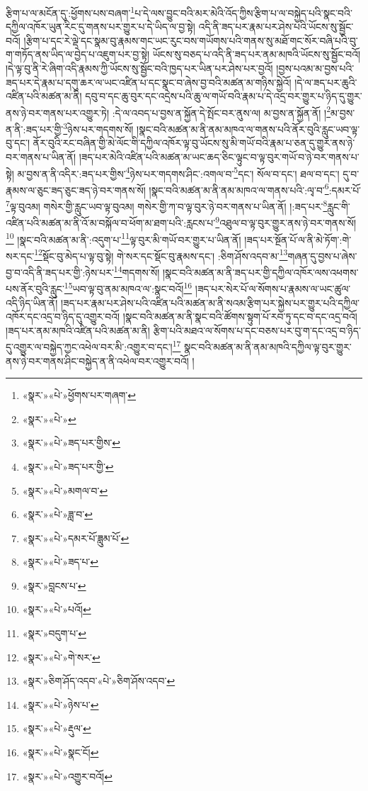 རྩིག་པ་ལ་མངོན་དུ་:ཕྱོགས་པས་བཞག་\footnote{«སྣར་»«པེ་»ཕྱོགས་པར་གཞག་}པ་དེ་ལས་བྱུང་བའི་མར་མེའི་འོད་ཀྱིས་རྩིག་པ་ལ་བསྐྱེད་པའི་སྣང་བའི་དཀྱིལ་འཁོར་ཡུན་རིང་དུ་གནས་པར་གྱུར་པ་དེ་ཡིད་ལ་བྱ་སྟེ། འདི་ནི་ཟད་པར་རྣམ་པར་ཤེས་པའི་ཡོངས་སུ་སྦྱོང་བའོ། །རྩིག་པ་དང་རེ་ལྡེ་དང་སྣམ་བུ་རྣམས་གང་ཡང་རུང་བས་གཡོགས་པའི་གནས་སུ་མཐོ་གང་སོར་བཞི་པའི་བུ་ག་གཏོད་ནས་ཡིད་ལ་བྱེད་པ་འཇུག་པར་བྱ་སྟེ། ཡོངས་སུ་བཅད་པ་འདི་ནི་ཟད་པར་ནམ་མཁའི་ཡོངས་སུ་སྦྱོང་བའོ། །དེ་ལྟ་བུ་ནི་རེ་ཞིག་འདི་རྣམས་ཀྱི་ཡོངས་སུ་སྦྱོང་བའི་ཁྱད་པར་ཡིན་པར་ཤེས་པར་བྱའོ། །བྱས་པའམ་མ་བྱས་པའི་ཟད་པར་དེ་རྣམ་པ་དགུ་ཆར་ལ་ཡང་འཛིན་པ་དང་སྣང་བ་ཞེས་བྱ་བའི་མཚན་མ་གཉིས་སྐྱེའོ། །དེ་ལ་ཟད་པར་ཆུའི་འཛིན་པའི་མཚན་མ་ནི། དབུ་བ་དང་ཆུ་བུར་དང་འདྲེས་པའི་ཆུ་ལ་གཡོ་བའི་རྣམ་པ་དེ་འདྲ་བར་གྱུར་པ་ཉིད་དུ་གྱུར་ནས་ཉེ་བར་གནས་པར་འགྱུར་ཏེ། :དེ་ལ་འབད་པ་བྱས་ན་སྐྱོན་དེ་སྤོང་བར་ནུས་ལ། མ་བྱས་ན་སྐྱོན་ནོ། །\footnote{«སྣར་»«པེ་»}མ་བྱས་ན་ནི་:ཟད་པར་གྱི་\footnote{«སྣར་»«པེ་»ཟད་པར་གྱིས་}ཉེས་པར་གདགས་སོ། །སྣང་བའི་མཚན་མ་ནི་ནམ་མཁའ་ལ་གནས་པའི་ནོར་བུའི་རླུང་ཡབ་ལྟ་བུ་དང་། ནོར་བུའི་རང་བཞིན་གྱི་མེ་ལོང་གི་དཀྱིལ་འཁོར་ལྟ་བུ་ཡོངས་སུ་མི་གཡོ་བའི་རྣམ་པ་ཅན་དུ་གྱུར་ནས་ཉེ་བར་གནས་པ་ཡིན་ནོ། །ཟད་པར་མེའི་འཛིན་པའི་མཚན་མ་ཡང་ཆད་ཅིང་ལྟུང་བ་ལྟ་བུར་གཡོ་བ་ཉེ་བར་གནས་པ་སྟེ། མ་བྱས་ན་ནི་འདིར་:ཟད་པར་གྱིས་\footnote{«སྣར་»«པེ་»ཟད་པར་གྱི་}ཉེས་པར་གདགས་ཤིང་:འགལ་བ་\footnote{«སྣར་»«པེ་»མགལ་བ་}དང་། སོལ་བ་དང་། ཐལ་བ་དང་། དུ་བ་རྣམས་ལ་ཅུང་ཟད་ཅུང་ཟད་ཉེ་བར་གནས་སོ། །སྣང་བའི་མཚན་མ་ནི་ནམ་མཁའ་ལ་གནས་པའི་:ལྭ་བ་\footnote{«སྣར་»«པེ་»ཟླ་བ་}:དམར་པོ་\footnote{«སྣར་»«པེ་»དམར་པོ་ཟླུམ་པོ་}ལྟ་བུའམ། གསེར་གྱི་རླུང་ཡབ་ལྟ་བུའམ། གསེར་གྱི་ཀ་བ་ལྟ་བུར་ཉེ་བར་གནས་པ་ཡིན་ནོ། །:ཟད་པར་\footnote{«སྣར་»«པེ་»ཟད་པ་}རླུང་གི་འཛིན་པའི་མཚན་མ་ནི་འོ་མ་བསྐོལ་བ་ཕོག་མ་ཐག་པའི་:རླངས་པ་\footnote{«སྣར་»བླངས་པ་}འཐུལ་བ་ལྟ་བུར་གྱུར་ནས་ཉེ་བར་གནས་སོ།\footnote{«སྣར་»«པེ་»པའོ།} །སྣང་བའི་མཚན་མ་ནི་:འདུག་པ་\footnote{«སྣར་»བདུག་པ་}ལྟ་བུར་མི་གཡོ་བར་གྱུར་པ་ཡིན་ནོ། །ཟད་པར་སྔོན་པོ་ལ་ནི་མེ་ཏོག་:གེ་སར་དང་\footnote{«སྣར་»«པེ་»གེ་སར་}སྡོང་བུ་མེད་པ་ལྟ་བུ་སྟེ། གེ་སར་དང་སྡོང་བུ་རྣམས་དང་། :ཅིག་ཤོས་འདབ་མ་\footnote{«སྣར་»ཅིག་ཤོད་འདབ་«པེ་»ཅིག་ཤོས་འདབ་}གཞན་དུ་བྱས་པ་ཞེས་བྱ་བ་འདི་ནི་ཟད་པར་གྱི་:ཉེས་པར་\footnote{«སྣར་»«པེ་»ཉེས་པ་}གདགས་སོ། །སྣང་བའི་མཚན་མ་ནི་ཟད་པར་གྱི་དཀྱིལ་འཁོར་ལས་འཕགས་པས་ནོར་བུའི་རླུང་\footnote{«སྣར་»«པེ་»རྡུལ་}ཡབ་ལྟ་བུ་ནམ་མཁའ་ལ་:སྣང་བའོ།\footnote{«སྣར་»«པེ་»སྣང་ངོ།} །ཟད་པར་སེར་པོ་ལ་སོགས་པ་རྣམས་ལ་ཡང་ཚུལ་འདི་ཉིད་ཡིན་ནོ། །ཟད་པར་རྣམ་པར་ཤེས་པའི་འཛིན་པའི་མཚན་མ་ནི་སའམ་རྩིག་པར་སྐྱེས་པར་གྱུར་པའི་དཀྱིལ་འཁོར་དང་འདྲ་བ་ཉིད་དུ་འགྱུར་བའོ། །སྣང་བའི་མཚན་མ་ནི་སྣང་བའི་ཚོགས་སྟུག་པོ་རབ་ཏུ་དང་བ་དང་འདྲ་བའོ། །ཟད་པར་ནམ་མཁའི་འཛིན་པའི་མཚན་མ་ནི། རྩིག་པའི་མཐའ་ལ་སོགས་པ་དང་བཅས་པར་བུ་ག་དང་འདྲ་བ་ཉིད་དུ་འགྱུར་ལ་བསྐྱེད་ཀྱང་འཕེལ་བར་མི་:འགྱུར་བ་དང་།\footnote{«སྣར་»«པེ་»འགྱུར་བའོ།} སྣང་བའི་མཚན་མ་ནི་ནམ་མཁའི་དཀྱིལ་ལྟ་བུར་གྱུར་ནས་ཉེ་བར་གནས་ཤིང་བསྐྱེད་ན་ནི་འཕེལ་བར་འགྱུར་བའོ། །

